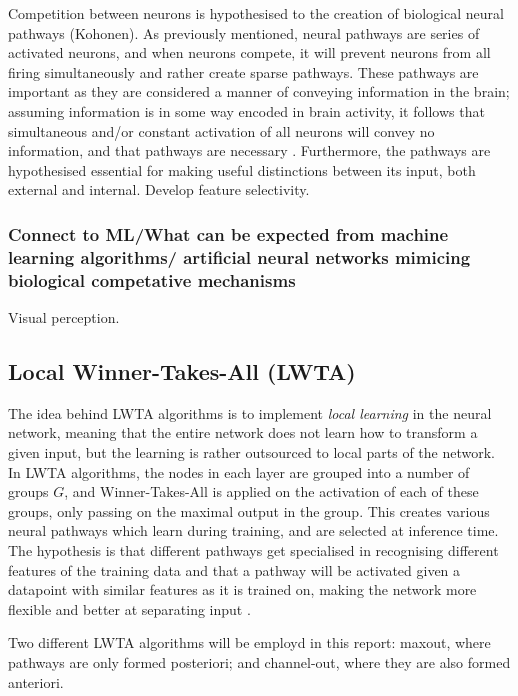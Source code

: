         Competition between neurons is hypothesised to  the creation of biological neural pathways (Kohonen).
        As previously mentioned, neural pathways are series of activated neurons, and when neurons compete, it will prevent neurons from all firing simultaneously and rather create sparse pathways. 
        These pathways are important as they are considered a manner of conveying information in the brain; assuming information is in some way encoded in brain activity, it follows that simultaneous and/or constant activation of all neurons will convey no information, and that pathways are necessary \citep{Chen}. 
        Furthermore, the pathways are hypothesised essential for making useful distinctions between its input, both external and internal. Develop feature selectivity.

    \subsubsection{Connect to ML/What can be expected from machine learning algorithms/ artificial neural networks mimicing biological competative mechanisms}
        Visual perception. 

\subsection{Local Winner-Takes-All (LWTA)}
    The idea behind LWTA algorithms is to implement \textit{local learning} in the neural network, meaning that the entire network does not learn how to transform a given input, but the learning is rather outsourced to local parts of the network. In LWTA algorithms, the nodes in each layer are grouped into a number of groups $G$, and Winner-Takes-All is applied on the activation of each of these groups, only passing on the maximal output in the group. This creates various neural pathways which learn during training, and are selected at inference time. The hypothesis is that different pathways get specialised in recognising different features of the training data and that a pathway will be activated given a datapoint with similar features as it is trained on, making the network more flexible and better at separating input \citep{Wang}. 

    Two different LWTA algorithms will be employd in this report: maxout, where pathways are only formed posteriori; and channel-out, where they are also formed anteriori.


